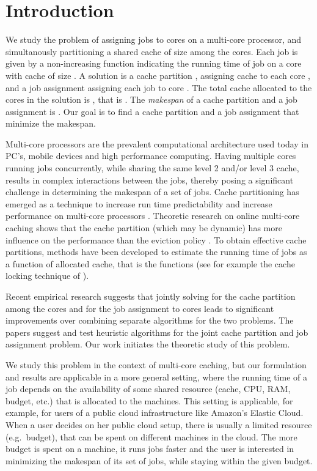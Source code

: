 \documentclass[11pt]{article}
\begin{document}
\section{Introduction}

We study the problem of  assigning  jobs to  cores on a multi-core processor, and simultanously partitioning a shared cache of size  among the cores.
Each job  is given by a non-increasing function  indicating the running time of job  on a core with cache of size .
A solution is a cache partition , assigning  cache to each core ,  and a job assignment  assigning each job  to core .
The total cache allocated to the cores in the solution is , that is  .
The {\em makespan} of a cache partition  and a job assignment  is .
Our goal is to find a cache partition and a job assignment that minimize the makespan.

Multi-core processors are the prevalent  computational architecture
used today in PC's, mobile devices and high performance computing.
Having multiple cores running jobs concurrently, while sharing the
same level 2 and/or level 3 cache, results in complex interactions
between  the jobs, thereby posing a significant challenge in
determining the makespan of a set of jobs.
Cache partitioning has emerged as a technique  to increase run time
predictability and increase performance on multi-core processors
\cite{part_survey, part_throughput}. Theoretic research on online
multi-core caching  shows that  the cache partition (which may be
dynamic)  has more influence on the performance than the eviction
policy \cite{Hassidim,LO12}. To obtain effective cache partitions,
methods have been developed to estimate the running time of jobs as
a function of allocated cache, that is the functions  (see
for example the cache locking technique of \cite{liu_lock1}).

Recent empirical research \cite{LZLX,liu_lock2} suggests that
jointly solving for the cache partition among the cores and for the
job assignment to cores leads to significant improvements over combining separate algorithms for the two problems.
The papers \cite{LZLX,liu_lock2} suggest and test heuristic algorithms for the joint cache partition and job assignment problem.
Our work initiates the theoretic study of this problem.

We study this problem in the context of multi-core caching, but our
formulation and results  are applicable in a more general setting,
where  the running time of a job  depends on the availability of
some shared resource (cache, CPU, RAM, budget, etc.) that is allocated to the
machines. This setting is  applicable, for example, for users of a
public cloud infrastructure like Amazon's Elastic Cloud. When a user
decides on her public cloud setup, there is usually a limited
resource (e.g.\ budget), that can be spent on different machines in
the cloud. The more budget is spent on a  machine, it runs jobs
faster and the user is interested in minimizing the makespan of its
set of jobs, while staying within the given budget.
\end{document}
